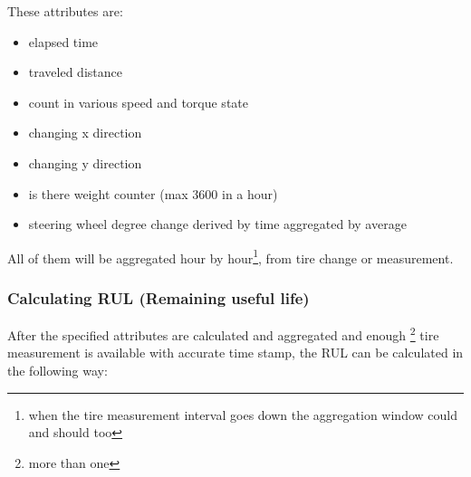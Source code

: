 	These attributes are:
	\begin{itemize}
		\item{elapsed time} 
		\item{traveled distance} 
		\item{count in various speed and torque state}
		\item{changing x direction}
		\item{changing y direction}
		\item{is there weight counter (max 3600 in a hour)}
		\item{steering wheel degree change derived by time aggregated by average}
	\end{itemize}
	All of them will be aggregated hour by hour\footnote{when the tire measurement interval goes down the aggregation window could and should too}, from tire change or measurement.
	\subsubsection{Calculating RUL (Remaining useful life)}
		\noindent
	After the specified attributes are calculated and aggregated and enough \footnote{more than one} tire measurement is available with accurate time stamp, the RUL can be calculated in the following way:

